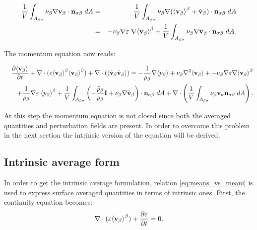 \begin{eqnarray}
\dfrac{1}{V} \int_{A_{\beta \sigma}} \nu_{\beta} \nabla \textbf{v}_{\beta} \cdot \mathbf{n}_{\sigma \beta} \;dA &=& \dfrac{1}{V} \int_{A_{\beta \sigma}} \nu_{\beta} \nabla ({\left< \textbf{v}_{\beta} \right>}^{\beta} +\tilde{\textbf{v}}_{\beta}) \cdot \mathbf{n}_{\sigma \beta} \;dA   \nonumber \\
&=& - \nu_{\beta} \nabla \varepsilon \; \nabla {\left< \textbf{v}_{\beta}\right>}^{\beta} + \dfrac{1}{V} \int_{A_{\beta \sigma}} \nu_{\beta} \nabla \tilde{\textbf{v}}_{\beta} \cdot \mathbf{n}_{\sigma \beta} \;dA.
\end{eqnarray}


\noindent The momentum equation now reads:

\begin{eqnarray}
&&\dfrac{\partial {\left< \textbf{v}_{\beta}\right>}}{\partial t} + \nabla \cdot (\varepsilon {\left< \textbf{v}_{\beta}\right>}^{\beta}{\left< \textbf{v}_{\beta} \right>}^{\beta}) + \nabla \cdot ({\left< \tilde{\textbf{v}}_{\beta}\tilde{\textbf{v}}_{\beta} \right>}) = -\dfrac{1}{\rho_{\beta}} \nabla {\left< p_{\beta}\right>} + \nu_{\beta}\nabla^2 {\left< \textbf{v}_{\beta} \right>} + - \nu_{\beta} \nabla \varepsilon \nabla {\left< \textbf{v}_{\beta}\right>}^{\beta}  \nonumber \\
&&+\dfrac{1}{\rho_{\beta}}\nabla\varepsilon \; {\left< p_{\beta} \right>}^{\beta} +\dfrac{1}{V} \displaystyle\int_{A_{\beta \sigma}} \left( -\dfrac{\tilde{p}_{\beta}}{\rho_{\beta}} \mathbf{I} + \nu_{\beta} \nabla \tilde{\textbf{v}}_{\beta}  \right)\cdot \mathbf{n}_{\sigma \beta} \;dA + \nabla \cdot \left( \dfrac{1}{V} \int_{A_{\beta \sigma}}  \nu_{\beta} \textbf{v}_{\sigma} \mathbf{n}_{\sigma \beta} \;dA \right).  \nonumber \\
\label{eq:NS_2}
\end{eqnarray}

At this step the momentum equation is not closed since both the averaged quantities and perturbation fields are present.
In order to overcome this problem in the next section the intrinsic version of the equation will be derived. 

\subsection{Intrinsic average form}
In order to get the intrinsic average formulation, relation \eqref{eq:means_vs_meani} is used to express surface averaged quantities in terms of intrinsic ones. First, the continuity equation becomes:
$$
\nabla \cdot (\varepsilon{\left< \textbf{v}_{\beta}\right>}^{\beta} ) + \dfrac{\partial \varepsilon}{\partial t}= 0.
$$


